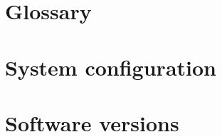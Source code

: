 \chapter{Glossary}
\label{ap:Glossary}

\chapter{System configuration}
\label{ap:Configuration}





\chapter{Software versions}
\label{ap:Versions}









